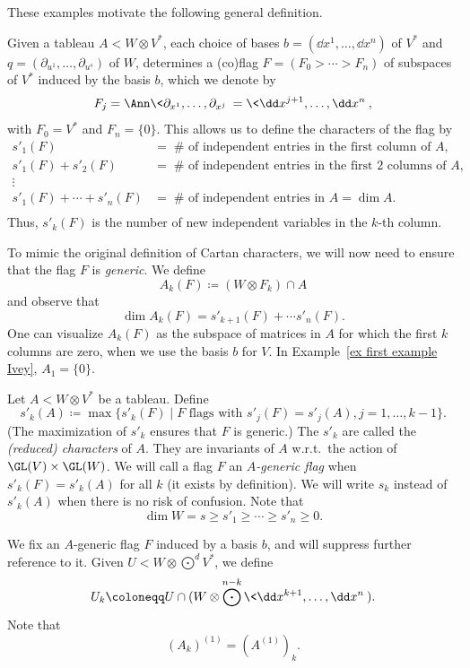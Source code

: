 These examples motivate the following general definition.

\begin{defn}[Characters]
    Given a tableau $A<W\otimes V^\ast$, each choice of bases $b=(\dd x^1,\ldots,\dd x^n)$ of $V^\ast$ and $q=(\partial_{u^1},\ldots,\partial_{u^s})$ of $W$, determines a (co)flag $F=(F_0>\cdots >F_n)$ of subspaces of $V^\ast$ induced by the basis $b$, which we denote by 
    \[F_j=\Ann\<\partial_{x^1},\ldots,\partial_{x^j}\>=\<\dd x^{j+1},\ldots, \dd x^n\>,\]
    with $F_0=V^\ast$ and $F_n=\{0\}$. This allows us to define the characters of the flag by 
    \begin{align*}
        s'_1(F)&=\; \#\text{ of independent entries in the first column of }A,\\
        s'_1(F)+s'_2(F)&=\; \#\text{ of independent entries in the first 2 columns of }A,\\
        \vdots &\\
        s'_1(F)+\cdots +s'_n(F)&=\; \#\text{ of independent entries in }A=\dim A.\\
    \end{align*}
    Thus, $s'_k(F)$ is the number of new independent variables in the $k$-th column.
\end{defn}

To mimic the original definition of Cartan characters, we will now need to ensure that the flag $F$ is \emph{generic}. We define 
\[A_k(F)\coloneqq (W\otimes F_k)\cap A\]
and observe that 
\[\dim A_k(F)=s'_{k+1}(F)+\cdots s'_n(F).\label{eq 5.17 Ivey}\]
One can visualize $A_k(F)$ as the subspace of matrices in $A$ for which the first $k$ columns are zero, when we use the basis $b$ for $V$. In Example~\ref{ex first example Ivey}, $A_1=\{0\}$.

\begin{defn}
    Let $A<W\otimes V^\ast$ be a tableau. Define 
    \[s'_k(A)\coloneqq \max\{s'_k(F)\mid F\text{ flags with }s'_j(F)=s'_j(A),j=1,\ldots,k-1\}.\]
    (The maximization of $s'_k$ ensures that $F$ is generic.) The $s'_k$ are called the \emph{(reduced) characters} of $A$. They are invariants of $A$ w.r.t.\ the action of $\GL(V)\times\GL(W)$. We will call a flag $F$ an \emph{$A$-generic flag} when $s'_k(F)=s'_k(A)$ for all $k$ (it exists by definition). We will write $s_k$ instead of $s'_k(A)$ when there is no risk of confusion. Note that 
    \[\dim W=s\geq s'_1\geq \cdots \geq s'_n\geq 0.\]
\end{defn}

We fix an $A$-generic flag $F$ induced by a basis $b$, and will suppress further reference to it. Given $U< W\otimes \bigodot^d V^\ast$, we define 
\[U_k\coloneqq U\cap (W\otimes \bigodot^{n-k}\<\dd x^{k+1},\ldots,\dd x^n\>).\]
Note that 
\[(A_k)^{(1)}=(A^{(1)})_k.\]

